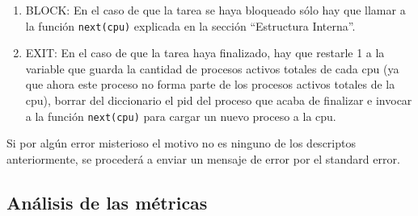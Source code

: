 \begin{itemize}
\begin{enumerate}
		\item BLOCK: En el caso de que la tarea se haya bloqueado s\'olo hay que llamar a la funci\'on \texttt{next(cpu)} explicada en la secci\'on ``Estructura Interna''.
		\item EXIT: En el caso de que la tarea haya finalizado, hay que restarle 1 a la variable que guarda la cantidad de procesos activos totales de cada cpu (ya que ahora este proceso no forma parte de los procesos activos totales de la cpu), borrar del diccionario el pid del proceso que acaba de finalizar e invocar a la funci\'on \texttt{next(cpu)} para cargar un nuevo proceso a la cpu.
	\end{enumerate}
	Si por alg\'un error misterioso el motivo no es ninguno de los descriptos anteriormente, se proceder\'a a enviar un mensaje de error por el standard error.
\end{itemize}

\subsection{An\'alisis de las m\'etricas}





















